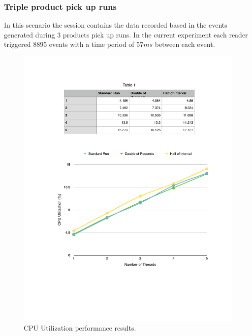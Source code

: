         \subsubsection{Triple product pick up runs}
        \label{subs:eval_exp_data_3laps}
        In this scenario the session contains the data recorded based in the events generated during 3 products
        pick up runs. In the current experiment each reader triggered 8895 events with a time period of 57$ms$
        between each event.\\

        \begin{figure}[ht!]
          \centering
          \includegraphics[width=.75\textwidth]{./images/cpu_3_lap}
          \caption{CPU Utilization performance results.}
          \label{fig:eval_3laps_cpu}
        \end{figure}

